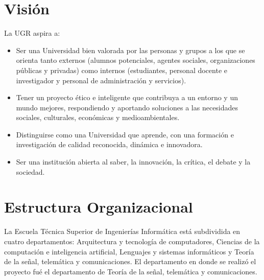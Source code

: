 \section{Visión}

La UGR aspira a: \cite{ugrMV}
\begin{itemize}
\item Ser una Universidad bien valorada por las personas y grupos a los que se orienta tanto externos (alumnos potenciales, agentes sociales, organizaciones públicas y privadas) como internos (estudiantes, personal docente e investigador y personal de administración y servicios).
\item Tener un proyecto ético e inteligente que contribuya a un entorno y un mundo mejores, respondiendo y aportando soluciones a las necesidades sociales, culturales, económicas y medioambientales.
\item Distinguirse como una Universidad que aprende, con una formación e investigación de calidad reconocida, dinámica e innovadora.
\item Ser una institución abierta al saber, la innovación,
la crítica, el debate y la sociedad. 
\end{itemize}

\section{Estructura Organizacional}

La Escuela Técnica Superior de Ingenierías Informática está subdividida en cuatro departamentos: Arquitectura y tecnología de computadores, Ciencias de la computación e inteligencia artificial,  Lenguajes y sistemas informáticos y Teoría de la señal, telemática y comunicaciones.\cite{etsiiDepart} 
El departamento en donde se realizó el proyecto fué el departamento de Teoría de la señal, telemática y comunicaciones.



